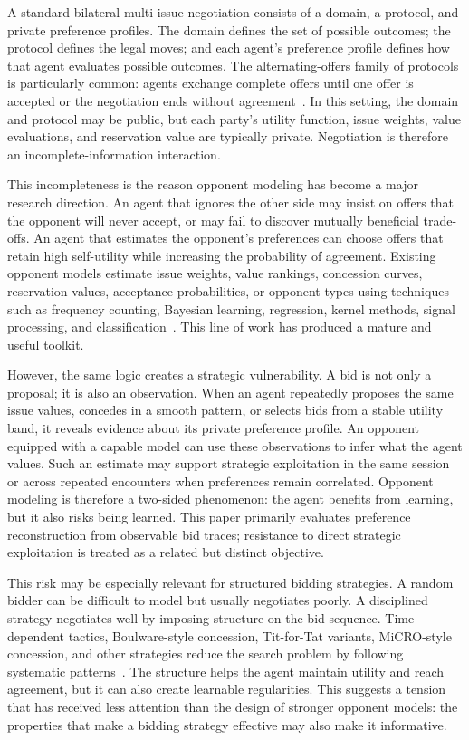 \documentclass[runningheads]{llncs}
\begin{document}
A standard bilateral multi-issue negotiation consists of a domain, a protocol, and private preference profiles. The domain defines the set of possible outcomes; the protocol defines the legal moves; and each agent's preference profile defines how that agent evaluates possible outcomes. The alternating-offers family of protocols is particularly common: agents exchange complete offers until one offer is accepted or the negotiation ends without agreement~\cite{AOP,SAOP}. In this setting, the domain and protocol may be public, but each party's utility function, issue weights, value evaluations, and reservation value are typically private. Negotiation is therefore an incomplete-information interaction.

This incompleteness is the reason opponent modeling has become a major research direction. An agent that ignores the other side may insist on offers that the opponent will never accept, or may fail to discover mutually beneficial trade-offs. An agent that estimates the opponent's preferences can choose offers that retain high self-utility while increasing the probability of agreement. Existing opponent models estimate issue weights, value rankings, concession curves, reservation values, acceptance probabilities, or opponent types using techniques such as frequency counting, Bayesian learning, regression, kernel methods, signal processing, and classification~\cite{survey_opponentmodel,rethinkfrequency,omBayesian}. This line of work has produced a mature and useful toolkit.

However, the same logic creates a strategic vulnerability. A bid is not only a proposal; it is also an observation. When an agent repeatedly proposes the same issue values, concedes in a smooth pattern, or selects bids from a stable utility band, it reveals evidence about its private preference profile. An opponent equipped with a capable model can use these observations to infer what the agent values. Such an estimate may support strategic exploitation in the same session or across repeated encounters when preferences remain correlated. Opponent modeling is therefore a two-sided phenomenon: the agent benefits from learning, but it also risks being learned. This paper primarily evaluates preference reconstruction from observable bid traces; resistance to direct strategic exploitation is treated as a related but distinct objective.

This risk may be especially relevant for structured bidding strategies. A random bidder can be difficult to model but usually negotiates poorly. A disciplined strategy negotiates well by imposing structure on the bid sequence. Time-dependent tactics, Boulware-style concession, Tit-for-Tat variants, MiCRO-style concession, and other strategies reduce the search problem by following systematic patterns~\cite{BasicAgent,nice_tit4tat_Baarslag2013,micro_1}. The structure helps the agent maintain utility and reach agreement, but it can also create learnable regularities. This suggests a tension that has received less attention than the design of stronger opponent models: the properties that make a bidding strategy effective may also make it informative.
\end{document}
